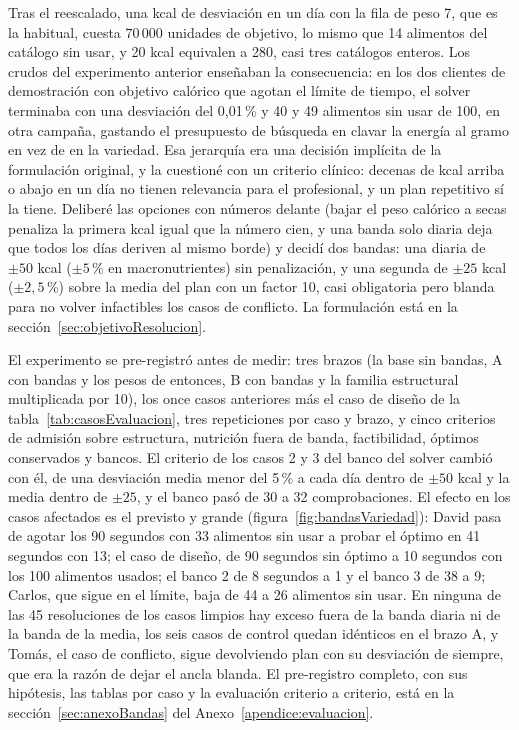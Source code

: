 Tras el reescalado, una kcal de desviación en un día con la fila de peso 7, que es la habitual, cuesta $70\,000$ unidades de objetivo, lo mismo que 14 alimentos del catálogo sin usar, y 20 kcal equivalen a 280, casi tres catálogos enteros. Los crudos del experimento anterior enseñaban la consecuencia: en los dos clientes de demostración con objetivo calórico que agotan el límite de tiempo, el solver terminaba con una desviación del 0,01\,\% y 40 y 49 alimentos sin usar de 100, en otra campaña, gastando el presupuesto de búsqueda en clavar la energía al gramo en vez de en la variedad. Esa jerarquía era una decisión implícita de la formulación original, y la cuestioné con un criterio clínico: decenas de kcal arriba o abajo en un día no tienen relevancia para el profesional, y un plan repetitivo sí la tiene. Deliberé las opciones con números delante (bajar el peso calórico a secas penaliza la primera kcal igual que la número cien, y una banda solo diaria deja que todos los días deriven al mismo borde) y decidí dos bandas: una diaria de $\pm 50$ kcal ($\pm 5$\,\% en macronutrientes) sin penalización, y una segunda de $\pm 25$ kcal ($\pm 2{,}5$\,\%) sobre la media del plan con un factor 10, casi obligatoria pero blanda para no volver infactibles los casos de conflicto. La formulación está en la sección~\ref{sec:objetivoResolucion}.

El experimento se pre-registró antes de medir: tres brazos (la base sin bandas, A con bandas y los pesos de entonces, B con bandas y la familia estructural multiplicada por 10), los once casos anteriores más el caso de diseño de la tabla~\ref{tab:casosEvaluacion}, tres repeticiones por caso y brazo, y cinco criterios de admisión sobre estructura, nutrición fuera de banda, factibilidad, óptimos conservados y bancos. El criterio de los casos 2 y 3 del banco del solver cambió con él, de una desviación media menor del 5\,\% a cada día dentro de $\pm 50$ kcal y la media dentro de $\pm 25$, y el banco pasó de 30 a 32 comprobaciones. El efecto en los casos afectados es el previsto y grande (figura~\ref{fig:bandasVariedad}): David pasa de agotar los 90 segundos con 33 alimentos sin usar a probar el óptimo en 41 segundos con 13; el caso de diseño, de 90 segundos sin óptimo a 10 segundos con los 100 alimentos usados; el banco 2 de 8 segundos a 1 y el banco 3 de 38 a 9; Carlos, que sigue en el límite, baja de 44 a 26 alimentos sin usar. En ninguna de las 45 resoluciones de los casos limpios hay exceso fuera de la banda diaria ni de la banda de la media, los seis casos de control quedan idénticos en el brazo A, y Tomás, el caso de conflicto, sigue devolviendo plan con su desviación de siempre, que era la razón de dejar el ancla blanda. El pre-registro completo, con sus hipótesis, las tablas por caso y la evaluación criterio a criterio, está en la sección~\ref{sec:anexoBandas} del Anexo~\ref{apendice:evaluacion}.

